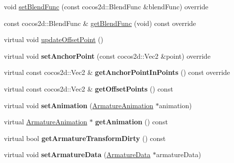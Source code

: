 \begin{DoxyCompactItemize}
void \hyperlink{classcocostudio_1_1Armature_a2adcf2445626fd9ebbc52923960c567c}{set\+Blend\+Func} (const cocos2d\+::\+Blend\+Func \&blend\+Func) override
\item 
const cocos2d\+::\+Blend\+Func \& \hyperlink{classcocostudio_1_1Armature_acd462bbd0dc9fec97bb2778a2ad13bfc}{get\+Blend\+Func} (void) const override
\item 
virtual void \hyperlink{classcocostudio_1_1Armature_a298f0a4ad78ad4b250bbed5dbdac7b67}{update\+Offset\+Point} ()
\item 
\mbox{\label{classcocostudio_1_1Armature_ad4af082dcf3d4b94cf5e151dd94f1063}} 
virtual void {\bfseries set\+Anchor\+Point} (const cocos2d\+::\+Vec2 \&point) override
\item 
\mbox{\label{classcocostudio_1_1Armature_a2ea227193d8d2b449c874631c24d5e90}} 
virtual const cocos2d\+::\+Vec2 \& {\bfseries get\+Anchor\+Point\+In\+Points} () const override
\item 
\mbox{\label{classcocostudio_1_1Armature_acad2870787715eced42d1393f435582e}} 
virtual const cocos2d\+::\+Vec2 \& {\bfseries get\+Offset\+Points} () const
\item 
\mbox{\label{classcocostudio_1_1Armature_aa671516038fce5df83da4e5f40587889}} 
virtual void {\bfseries set\+Animation} (\hyperlink{classcocostudio_1_1ArmatureAnimation}{Armature\+Animation} $\ast$animation)
\item 
\mbox{\label{classcocostudio_1_1Armature_ad7b430c3e58680ab65b36955e41db448}} 
virtual \hyperlink{classcocostudio_1_1ArmatureAnimation}{Armature\+Animation} $\ast$ {\bfseries get\+Animation} () const
\item 
\mbox{\label{classcocostudio_1_1Armature_aa79a4487888f6ba24e46e581f4e6a1a9}} 
virtual bool {\bfseries get\+Armature\+Transform\+Dirty} () const
\item 
\mbox{\label{classcocostudio_1_1Armature_ae1796e26e80c5804e3a255981e2b5acc}} 
virtual void {\bfseries set\+Armature\+Data} (\hyperlink{classcocostudio_1_1ArmatureData}{Armature\+Data} $\ast$armature\+Data)

\end{DoxyCompactItemize}
